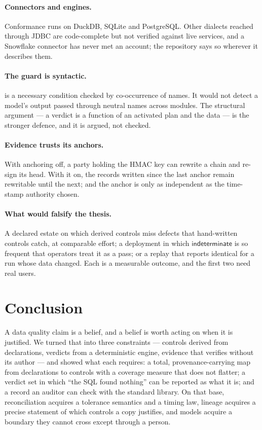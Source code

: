 \documentclass[11pt,a4paper]{article}
\renewcommand{\_}{\oldunderscore\allowbreak}
\theoremstyle{plain}
\theoremstyle{definition}
\theoremstyle{remark}
\newcommand{\IND}{\textsf{indeterminate}}
\begin{document}
\paragraph{Connectors and engines.} Conformance runs on DuckDB, SQLite and PostgreSQL. Other dialects reached
through JDBC are code-complete but not verified against live services, and a Snowflake connector has never met
an account; the repository says so wherever it describes them.

\paragraph{The guard is syntactic.}  is a necessary condition checked by co-occurrence of
names. It would not detect a model's output passed through neutral names across modules. The structural
argument --- a verdict is a function of an activated plan and the data --- is the stronger defence, and it is
argued, not checked.

\paragraph{Evidence trusts its anchors.} With anchoring off, a party holding the HMAC key can rewrite a chain
and re-sign its head. With it on, the records written since the last anchor remain rewritable until the next;
and the anchor is only as independent as the time-stamp authority chosen.

\paragraph{What would falsify the thesis.} A declared estate on which derived controls miss defects that
hand-written controls catch, at comparable effort; a deployment in which $\IND$ is so frequent that operators
treat it as a pass; or a replay that reports \textsf{identical} for a run whose data changed. Each is a
measurable outcome, and the first two need real users.

\section{Conclusion}\label{sec:conclusion}

A data quality claim is a belief, and a belief is worth acting on when it is justified. We turned that into
three constraints --- controls derived from declarations, verdicts from a deterministic engine, evidence that
verifies without its author --- and showed what each requires: a total, provenance-carrying map from
declarations to controls with a coverage measure that does not flatter; a verdict set in which ``the SQL found
nothing'' can be reported as what it is; and a record an auditor can check with the standard library. On that
base, reconciliation acquires a tolerance semantics and a timing law, lineage acquires a precise statement of
which controls a copy justifies, and models acquire a boundary they cannot cross except through a person.
\end{document}
